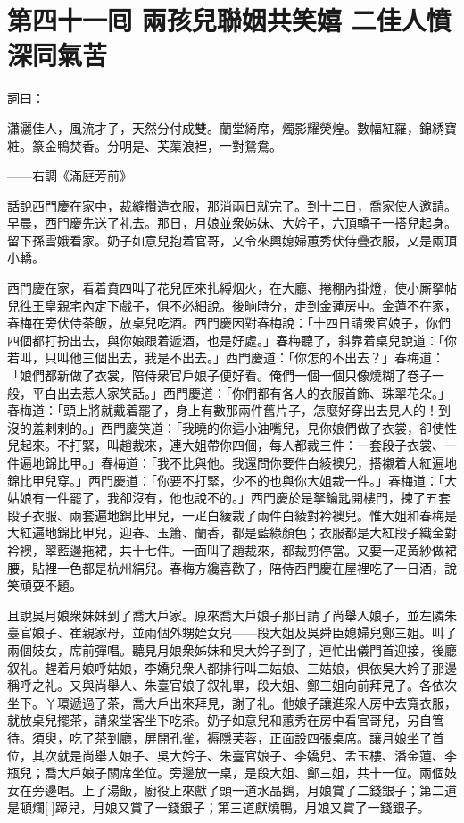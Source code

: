
\chapter*{第四十一囘 兩孩兒聯姻共笑嬉 二佳人憤深同氣苦}


詞曰：

瀟灑佳人，風流才子，天然分付成雙。蘭堂綺席，燭影耀熒煌。數幅紅羅，錦綉寶粧。篆金鴨焚香。分明是、芙蕖浪裡，一對鴛鴦。

——右調《滿庭芳前》

話說西門慶在家中，裁縫攢造衣服，那消兩日就完了。到十二日，喬家使人邀請。早晨，西門慶先送了礼去。那日，月娘並衆姊妹、大妗子，六頂轎子一搭兒起身。留下孫雪娥看家。奶子如意兒抱着官哥，又令來興媳婦蕙秀伏侍疊衣服，又是兩頂小轎。

西門慶在家，看着賁四叫了花兒匠來扎縛烟火，在大廳、捲棚內掛燈，使小厮拏帖兒徃王皇親宅內定下戲子，俱不必細說。後晌時分，走到金蓮房中。金蓮不在家，春梅在旁伏侍茶飯，放桌兒吃酒。西門慶因對春梅說：「十四日請衆官娘子，你們四個都打扮出去，與你娘跟着遞酒，也是好處。」春梅聽了，斜靠着桌兒說道：「你若叫，只叫他三個出去，我是不出去。」西門慶道：「你怎的不出去？」春梅道：「娘們都新做了衣裳，陪侍衆官戶娘子便好看。俺們一個一個只像燒糊了卷子一般，平白出去惹人家笑話。」西門慶道：「你們都有各人的衣服首飾、珠翠花朵。」春梅道：「頭上將就戴着罷了，身上有數那兩件舊片子，怎麼好穿出去見人的！到沒的羞剌剌的。」西門慶笑道：「我曉的你這小油嘴兒，見你娘們做了衣裳，卻使性兒起來。不打緊，叫趙裁來，連大姐帶你四個，每人都裁三件：一套段子衣裳、一件遍地錦比甲。」春梅道：「我不比與他。我還問你要件白綾襖兒，搭襯着大紅遍地錦比甲兒穿。」{}西門慶道：「你要不打緊，少不的也與你大姐裁一件。」春梅道：「大姑娘有一件罷了，我卻沒有，他也說不的。」西門慶於是拏鑰匙開樓門，揀了五套段子衣服、兩套遍地錦比甲兒，一疋白綾裁了兩件白綾對衿襖兒。惟大姐和春梅是大紅遍地錦比甲兒，迎春、玉簫、蘭香，都是藍綠顏色；衣服都是大紅段子織金對衿襖，翠藍邊拖裙，共十七件。一面叫了趙裁來，都裁剪停當。又要一疋黃紗做裙腰，貼裡一色都是杭州絹兒。春梅方纔喜歡了，陪侍西門慶在屋裡吃了一日酒，說笑頑耍不題。

且說吳月娘衆妹妹到了喬大戶家。原來喬大戶娘子那日請了尚舉人娘子，並左隣朱臺官娘子、崔親家母，並兩個外甥姪女兒——段大姐及吳舜臣媳婦兒鄭三姐。叫了兩個妓女，席前彈唱。聽見月娘衆姊妹和吳大妗子到了，連忙出儀門首迎接，後廳叙礼。趕着月娘呼姑娘，李嬌兒衆人都排行叫二姑娘、三姑娘，俱依吳大妗子那邊稱呼之礼。又與尚舉人、朱臺官娘子叙礼畢，段大姐、鄭三姐向前拜見了。各依次坐下。丫環遞過了茶，喬大戶出來拜見，謝了礼。他娘子讓進衆人房中去寬衣服，就放桌兒擺茶，請衆堂客坐下吃茶。奶子如意兒和蕙秀在房中看官哥兒，另自管待。須臾，吃了茶到廳，屏開孔雀，褥隱芙蓉，正面設四張桌席。讓月娘坐了首位，其次就是尚舉人娘子、吳大妗子、朱臺官娘子、李嬌兒、孟玉樓、潘金蓮、李瓶兒；喬大戶娘子關席坐位。旁邊放一桌，是段大姐、鄭三姐，共十一位。兩個妓女在旁邊唱。上了湯飯，廚役上來獻了頭一道水晶鵝，月娘賞了二錢銀子；第二道是頓爛[]蹄兒，月娘又賞了一錢銀子；第三道獻燒鴨，月娘又賞了一錢銀子。

